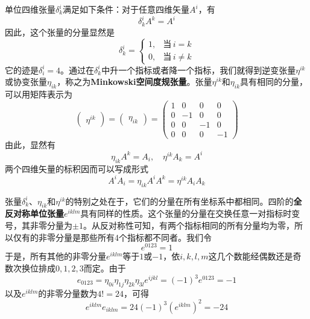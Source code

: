 单位四维张量$\delta^i_k$满足如下条件：对于任意四维矢量$A^i$，有
\begin{equation}
	\delta^i_k A^k = A^i
\end{equation}
因此，这个张量的分量显然是
\begin{equation}
	\delta^i_k = \begin{cases} 1,& \text{当}\,i=k \\ 0, &\text{当}\,i\neq k \end{cases}
\end{equation}
它的迹是$\delta^i_i = 4$。通过在$\delta^i_k$中升一个指标或者降一个指标，我们就得到逆变张量$\eta^{ik}$或协变张量$\eta_{ik}$，称之为{\bf Minkowski空间度规张量}。张量$\eta^{ik}$和$\eta_{ik}$具有相同的分量，可以用矩阵表示为
\begin{equation}
	\begin{pmatrix} \eta^{ik} \end{pmatrix} = \begin{pmatrix} \eta_{ik} \end{pmatrix} = \begin{pmatrix} 1 & 0 & 0 & 0 \\ 0 & -1 & 0 & 0 \\ 0 & 0 & -1 & 0 \\ 0 & 0 & 0 & -1 \end{pmatrix}
\end{equation}
由此，显然有
\begin{equation}
	\eta_{ik} A^k = A_i,\quad \eta^{ik} A_k = A^i
\end{equation}
两个四维矢量的标积因而可以写成形式
\begin{equation}
	A^i A_i = \eta_{ik}A^iA^k = \eta^{ik}A_iA_k
\end{equation}

张量$\delta^i_k$、$\eta_{ik}$和$\eta^{ik}$的特别之处在于，它们的分量在所有坐标系中都相同。四阶的{\bf 全反对称单位张量}$e^{iklm}$具有同样的性质。这个张量的分量在交换任意一对指标时变号，其非零分量为$\pm 1$。从反对称性可知，有两个指标相同的所有分量均为零，所以仅有的非零分量是那些所有4个指标都不同者。我们令
\begin{equation}
	e^{0123} = 1
\end{equation}
于是，所有其他的非零分量$e^{iklm}$等于$1$或$-1$，依$i,k,l,m$这几个数能经偶数还是奇数次换位排成$0,1,2,3$而定。由于
\begin{equation*}
	e_{0123} = \eta_{0i}\eta_{1j}\eta_{2k}\eta_{3l} e^{ijkl} = (-1)^3e^{0123} = -1
\end{equation*}
以及$e^{iklm}$的非零分量数为$4!=24$，可得
\begin{equation}
	e^{iklm}e_{iklm} = 24(-1)^3(e^{iklm})^2 = -24
\end{equation}

